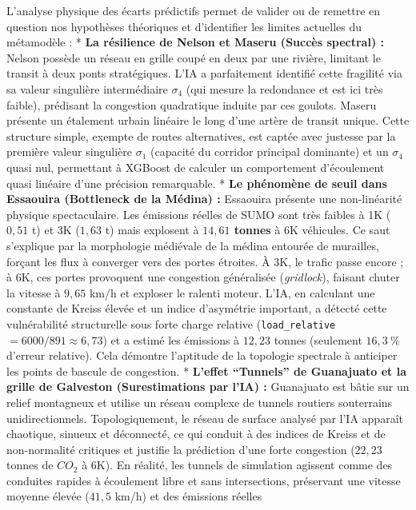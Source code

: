 \documentclass[10pt, a4paper]{article}
\begin{document}
L'analyse physique des écarts prédictifs permet de valider ou de
remettre en question nos hypothèses théoriques et d'identifier les
limites actuelles du métamodèle : * \textbf{La résilience de Nelson et
Maseru (Succès spectral) :} Nelson possède un réseau en grille coupé en
deux par une rivière, limitant le transit à deux ponts stratégiques.
L'IA a parfaitement identifié cette fragilité via sa valeur singulière
intermédiaire \(\sigma_4\) (qui mesure la redondance et est ici très
faible), prédisant la congestion quadratique induite par ces goulots.
Maseru présente un étalement urbain linéaire le long d'une artère de
transit unique. Cette structure simple, exempte de routes alternatives,
est captée avec justesse par la première valeur singulière \(\sigma_1\)
(capacité du corridor principal dominante) et un \(\sigma_4\) quasi nul,
permettant à XGBoost de calculer un comportement d'écoulement quasi
linéaire d'une précision remarquable. * \textbf{Le phénomène de seuil
dans Essaouira (Bottleneck de la Médina) :} Essaouira présente une
non-linéarité physique spectaculaire. Les émissions réelles de SUMO sont
très faibles à 1K (\(0,51\) t) et 3K (\(1,63\) t) mais explosent à
\textbf{\(14,61\) tonnes} à 6K véhicules. Ce saut s'explique par la
morphologie médiévale de la médina entourée de murailles, forçant les
flux à converger vers des portes étroites. À 3K, le trafic passe encore
; à 6K, ces portes provoquent une congestion généralisée
(\emph{gridlock}), faisant chuter la vitesse à \(9,65\) km/h et exploser
le ralenti moteur. L'IA, en calculant une constante de Kreiss élevée et
un indice d'asymétrie important, a détecté cette vulnérabilité
structurelle sous forte charge relative (\texttt{load\_relative}
\(= 6000 / 891 \approx 6,73\)) et a estimé les émissions à \(12,23\)
tonnes (seulement \(16,3\ \%\) d'erreur relative). Cela démontre
l'aptitude de la topologie spectrale à anticiper les points de bascule
de congestion. * \textbf{L'effet ``Tunnels'' de Guanajuato et la grille
de Galveston (Surestimations par l'IA) :} Guanajuato est bâtie sur un
relief montagneux et utilise un réseau complexe de tunnels routiers
souterrains unidirectionnels. Topologiquement, le réseau de surface
analysé par l'IA apparaît chaotique, sinueux et déconnecté, ce qui
conduit à des indices de Kreiss et de non-normalité critiques et
justifie la prédiction d'une forte congestion (\(22,23\) tonnes de
\(CO_2\) à 6K). En réalité, les tunnels de simulation agissent comme des
conduites rapides à écoulement libre et sans intersections, préservant
une vitesse moyenne élevée (\(41,5\) km/h) et des émissions réelles
\end{document}
